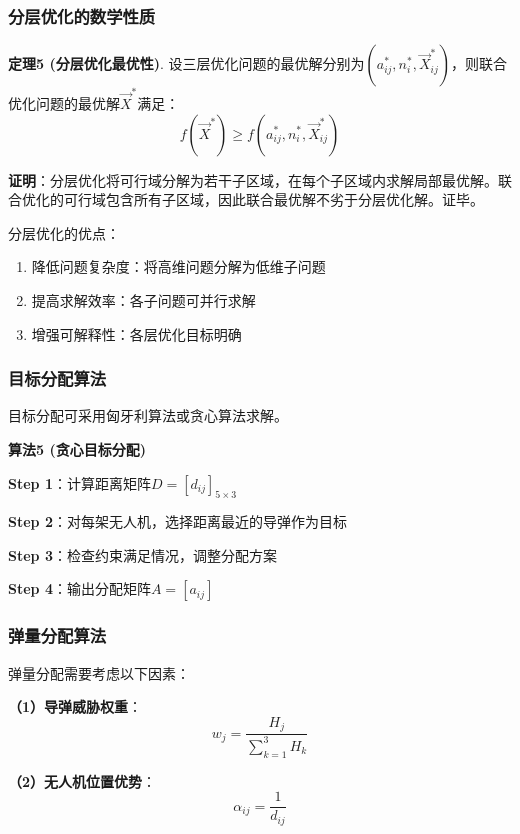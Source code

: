 \documentclass[12pt,a4paper]{article}
\begin{document}
\subsubsection{分层优化的数学性质}

\noindent\textbf{定理5 (分层优化最优性)}. 设三层优化问题的最优解分别为$(a_{ij}^*, n_i^*, \vec{X}_{ij}^*)$，则联合优化问题的最优解$\vec{X}^*$满足：
\begin{equation}
f(\vec{X}^*) \geq f(a_{ij}^*, n_i^*, \vec{X}_{ij}^*)
\end{equation}

\noindent\textbf{证明}：分层优化将可行域分解为若干子区域，在每个子区域内求解局部最优解。联合优化的可行域包含所有子区域，因此联合最优解不劣于分层优化解。证毕。

\indent 分层优化的优点：
\begin{enumerate}
\item 降低问题复杂度：将高维问题分解为低维子问题
\item 提高求解效率：各子问题可并行求解
\item 增强可解释性：各层优化目标明确
\end{enumerate}

\subsubsection{目标分配算法}

\indent 目标分配可采用匈牙利算法或贪心算法求解。

\noindent\textbf{算法5 (贪心目标分配)}

\indent \textbf{Step 1}：计算距离矩阵$D = [d_{ij}]_{5 \times 3}$

\indent \textbf{Step 2}：对每架无人机，选择距离最近的导弹作为目标

\indent \textbf{Step 3}：检查约束满足情况，调整分配方案

\indent \textbf{Step 4}：输出分配矩阵$A = [a_{ij}]$

\subsubsection{弹量分配算法}

\indent 弹量分配需要考虑以下因素：

\noindent\textbf{（1）导弹威胁权重}：
\begin{equation}
w_j = \frac{H_j}{\sum_{k=1}^{3} H_k}
\end{equation}

\noindent\textbf{（2）无人机位置优势}：
\begin{equation}
\alpha_{ij} = \frac{1}{d_{ij}}
\end{equation}
\end{document}
